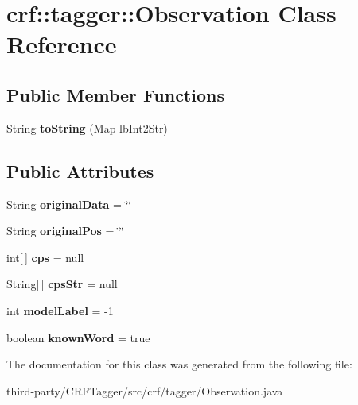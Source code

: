 \hypertarget{classcrf_1_1tagger_1_1Observation}{
\section{crf::tagger::Observation Class Reference}
\label{classcrf_1_1tagger_1_1Observation}
}
\subsection*{Public Member Functions}
\begin{DoxyCompactItemize}
\item 
\hypertarget{classcrf_1_1tagger_1_1Observation_a4b9bf438a35b9d72c098b8a7a7502883}{
String {\bfseries toString} (Map lbInt2Str)}
\label{classcrf_1_1tagger_1_1Observation_a4b9bf438a35b9d72c098b8a7a7502883}

\end{DoxyCompactItemize}
\subsection*{Public Attributes}
\begin{DoxyCompactItemize}
\item 
\hypertarget{classcrf_1_1tagger_1_1Observation_a6a2fe5ac460451832d40ffd256d15c8d}{
String {\bfseries originalData} = \char`\"{}\char`\"{}}
\label{classcrf_1_1tagger_1_1Observation_a6a2fe5ac460451832d40ffd256d15c8d}

\item 
\hypertarget{classcrf_1_1tagger_1_1Observation_a7b5c1f0e5baf46b88b10eddc8932bb2f}{
String {\bfseries originalPos} = \char`\"{}\char`\"{}}
\label{classcrf_1_1tagger_1_1Observation_a7b5c1f0e5baf46b88b10eddc8932bb2f}

\item 
\hypertarget{classcrf_1_1tagger_1_1Observation_a244b6d2a74d93e04ba53e687819a0dfe}{
int\mbox{[}$\,$\mbox{]} {\bfseries cps} = null}
\label{classcrf_1_1tagger_1_1Observation_a244b6d2a74d93e04ba53e687819a0dfe}

\item 
\hypertarget{classcrf_1_1tagger_1_1Observation_a9eff4d25166907549a6ec286db6cb716}{
String\mbox{[}$\,$\mbox{]} {\bfseries cpsStr} = null}
\label{classcrf_1_1tagger_1_1Observation_a9eff4d25166907549a6ec286db6cb716}

\item 
\hypertarget{classcrf_1_1tagger_1_1Observation_a61219102d93bbeb3495551a0ad82bc91}{
int {\bfseries modelLabel} = -\/1}
\label{classcrf_1_1tagger_1_1Observation_a61219102d93bbeb3495551a0ad82bc91}

\item 
\hypertarget{classcrf_1_1tagger_1_1Observation_a7a356e6a726b81a4eeb53e25c2b7f6ed}{
boolean {\bfseries knownWord} = true}
\label{classcrf_1_1tagger_1_1Observation_a7a356e6a726b81a4eeb53e25c2b7f6ed}

\end{DoxyCompactItemize}


The documentation for this class was generated from the following file:\begin{DoxyCompactItemize}
\item 
third-\/party/CRFTagger/src/crf/tagger/Observation.java\end{DoxyCompactItemize}
